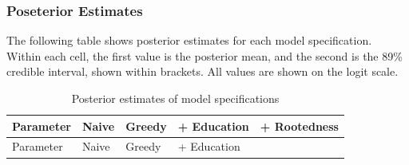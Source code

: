 \documentclass[
  letterpaper,
  DIV=11,
  numbers=noendperiod]{scrartcl}
\begin{document}
\subsubsection{Poseterior Estimates}\label{poseterior-estimates}

The following table shows posterior estimates for each model
specification. Within each cell, the first value is the posterior mean,
and the second is the 89\% credible interval, shown within brackets. All
values are shown on the logit scale.

\begin{longtable}[]{@{}
  >{\raggedright\arraybackslash}p{}
  >{\raggedleft\arraybackslash}p{}
  >{\raggedleft\arraybackslash}p{}
  >{\raggedleft\arraybackslash}p{}
  >{\raggedleft\arraybackslash}p{}@{}}
\caption{Posterior estimates of model
specifications}\label{tbl-1}\tabularnewline
\toprule\noalign{}
\begin{minipage}[b]{\linewidth}\raggedright
Parameter
\end{minipage} & \begin{minipage}[b]{\linewidth}\raggedleft
Naive
\end{minipage} & \begin{minipage}[b]{\linewidth}\raggedleft
Greedy
\end{minipage} & \begin{minipage}[b]{\linewidth}\raggedleft
+ Education
\end{minipage} & \begin{minipage}[b]{\linewidth}\raggedleft
+ Rootedness
\end{minipage} \\
\midrule\noalign{}
\endfirsthead
\toprule\noalign{}
\begin{minipage}[b]{\linewidth}\raggedright
Parameter
\end{minipage} & \begin{minipage}[b]{\linewidth}\raggedleft
Naive
\end{minipage} & \begin{minipage}[b]{\linewidth}\raggedleft
Greedy
\end{minipage} & \begin{minipage}[b]{\linewidth}\raggedleft
+ Education
\end{minipage} & \begin{minipage}[b]{\linewidth}\raggedleft

\end{minipage}
\end{longtable}
\end{document}
